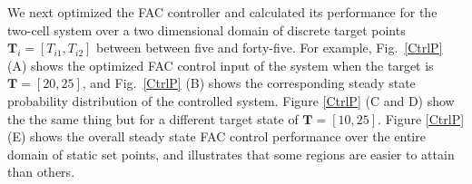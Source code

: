 \documentclass[12pt]{iopart}
\begin{document}
We next optimized the FAC controller and calculated its performance for the two-cell system over a two dimensional domain of discrete target points $\mathbf{T}_i = [T_{i1},T_{i2}]$ between between five and forty-five. For example, Fig.\ \ref{CtrlP} (A) shows the optimized FAC control input of the system when the target is $\mathbf{T}=[20,25]$, and Fig.\ \ref{CtrlP} (B) shows the corresponding steady state probability distribution of the controlled system. Figure \ref{CtrlP} (C and D) show the the same thing but for a different target state of $\mathbf{T}=[10, 25]$.
Figure \ref{CtrlP}(E) shows the overall steady state FAC control performance over the entire domain of static set points, and illustrates that some regions are easier to attain than others. 
\end{document}
